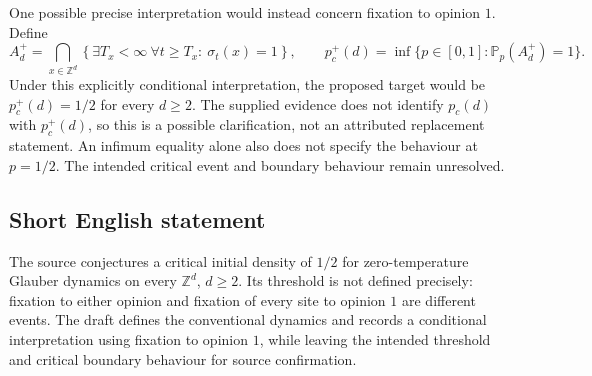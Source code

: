 \documentclass[11pt]{article}
\newcommand{\Z}{\mathbb{Z}}
\begin{document}
One possible precise interpretation would instead concern fixation to opinion \(1\). Define
\[
 A_d^+=\bigcap_{x\in\Z^d}\left\{\exists T_x<\infty\ \forall t\geq T_x:\ \sigma_t(x)=1\right\},
 \qquad
 p_c^+(d)=\inf\{p\in[0,1]:\mathbb P_p(A_d^+)=1\}.
\]
Under this explicitly conditional interpretation, the proposed target would be \(p_c^+(d)=1/2\) for every \(d\geq2\). The supplied evidence does not identify \(p_c(d)\) with \(p_c^+(d)\), so this is a possible clarification, not an attributed replacement statement. An infimum equality alone also does not specify the behaviour at \(p=1/2\). The intended critical event and boundary behaviour remain unresolved.
\subsection{Short English statement}
The source conjectures a critical initial density of \(1/2\) for zero-temperature Glauber dynamics on every \(\Z^d\), \(d\geq2\). Its threshold is not defined precisely: fixation to either opinion and fixation of every site to opinion \(1\) are different events. The draft defines the conventional dynamics and records a conditional interpretation using fixation to opinion \(1\), while leaving the intended threshold and critical boundary behaviour for source confirmation.
\end{document}

